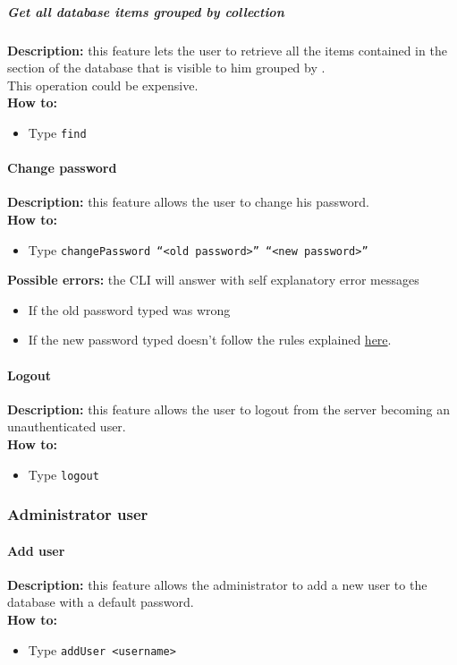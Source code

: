 \documentclass{scalatekids-article}
\begin{document}
\subparagraph{Get all database items grouped by collection}
\textbf{Description:} this feature lets the user to retrieve all the items contained in the section of the database that is visible to him grouped by .\\
This operation could be expensive.\\
\textbf{How to:}
\begin{itemize}
\item Type \texttt{find}
\end{itemize}

\paragraph{Change password}
\label{sec:changepassword}
\textbf{Description:} this feature allows the user to change his password.\\
\textbf{How to:}
\begin{itemize}
\item Type \texttt{changePassword ``<old password>'' ``<new password>''}
\end{itemize}
\textbf{Possible errors:} the CLI will answer with self explanatory error messages
\begin{itemize}
\item If the old password typed was wrong
\item If the new password typed doesn't follow the rules explained \hyperref[sec:passwordrequirement]{here}.
\end{itemize}

\paragraph{Logout}
\label{sec:logout}
\textbf{Description:} this feature allows the user to logout from the server becoming an unauthenticated user.\\
\textbf{How to:}
\begin{itemize}
\item Type \texttt{logout}
\end{itemize}

\subsubsection{Administrator user}
\label{sec:administratoruser}

\paragraph{Add user}
\label{sec:adduser}
\textbf{Description:} this feature allows the administrator to add a new user to the database with a default password.\\
\textbf{How to:}
\begin{itemize}
\item Type \texttt{addUser <username>}
\end{itemize}
\end{document}
